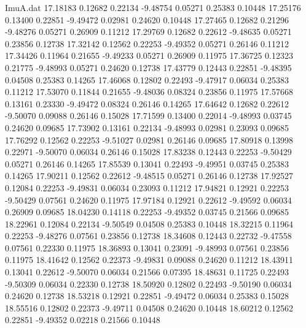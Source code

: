 \begin{filecontents}{ImuA.dat}
  17.18183    0.12682    0.22134   -9.48754    0.05271    0.25383    0.10448
  17.25176    0.13400    0.22851   -9.49472    0.02981    0.24620    0.10448
  17.27465    0.12682    0.21296   -9.48276    0.05271    0.26909    0.11212
  17.29769    0.12682    0.22612   -9.48635    0.05271    0.23856    0.12738
  17.32142    0.12562    0.22253   -9.49352    0.05271    0.26146    0.11212
  17.34426    0.11964    0.21655   -9.49233    0.05271    0.26909    0.11975
  17.36725    0.12323    0.21775   -9.48993    0.05271    0.24620    0.12738
  17.43779    0.12443    0.22851   -9.48395    0.04508    0.25383    0.14265
  17.46068    0.12802    0.22493   -9.47917    0.06034    0.25383    0.11212
  17.53070    0.11844    0.21655   -9.48036    0.08324    0.23856    0.11975
  17.57668    0.13161    0.23330   -9.49472    0.08324    0.26146    0.14265
  17.64642    0.12682    0.22612   -9.50070    0.09088    0.26146    0.15028
  17.71599    0.13400    0.22014   -9.48993    0.03745    0.24620    0.09685
  17.73902    0.13161    0.22134   -9.48993    0.02981    0.23093    0.09685
  17.76292    0.12562    0.22253   -9.51027    0.02981    0.26146    0.09685
  17.80918    0.13998    0.22971   -9.50070    0.06034    0.26146    0.15028
  17.83238    0.12443    0.22253   -9.50429    0.05271    0.26146    0.14265
  17.85539    0.13041    0.22493   -9.49951    0.03745    0.25383    0.14265
  17.90211    0.12562    0.22612   -9.48515    0.05271    0.26146    0.12738
  17.92527    0.12084    0.22253   -9.49831    0.06034    0.23093    0.11212
  17.94821    0.12921    0.22253   -9.50429    0.07561    0.24620    0.11975
  17.97184    0.12921    0.22612   -9.49592    0.06034    0.26909    0.09685
  18.04230    0.14118    0.22253   -9.49352    0.03745    0.21566    0.09685
  18.22961    0.12084    0.22134   -9.50549    0.04508    0.25383    0.10448
  18.32215    0.11964    0.22253   -9.48276    0.07561    0.23856    0.12738
  18.34608    0.12443    0.22732   -9.47558    0.07561    0.22330    0.11975
  18.36893    0.13041    0.23091   -9.48993    0.07561    0.23856    0.11975
  18.41642    0.12562    0.22373   -9.49831    0.09088    0.24620    0.11212
  18.43911    0.13041    0.22612   -9.50070    0.06034    0.21566    0.07395
  18.48631    0.11725    0.22493   -9.50309    0.06034    0.22330    0.12738
  18.50920    0.12802    0.22493   -9.50190    0.06034    0.24620    0.12738
  18.53218    0.12921    0.22851   -9.49472    0.06034    0.25383    0.15028
  18.55516    0.12802    0.22373   -9.49711    0.04508    0.24620    0.10448
  18.60212    0.12562    0.22851   -9.49352    0.02218    0.21566    0.10448

\end{filecontents}
